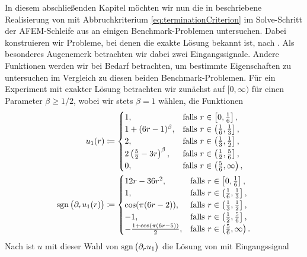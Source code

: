 In diesem abschließenden Kapitel möchten wir nun die in
 beschriebene Realisierung von
 mit Abbruchkriterium
\eqref{eq:terminationCriterion} im Solve-Schritt der AFEM-Schleife aus
 an einigen Benchmark-Problemen untersuchen.
Dabei konstruieren wir Probleme, bei denen die exakte Lösung bekannt ist,
nach . 
Als besonderes Augenemerk betrachten wir dabei zwei Eingangssignale.
Andere Funktionen werden wir bei Bedarf betrachten, um bestimmte Eigenschaften
zu untersuchen im Vergleich zu diesen beiden Benchmark-Problemen.
Für ein Experiment mit exakter Lösung betrachten wir zunächst auf $[0,\infty)$
für einen Parameter $\beta\geq 1/2$, wobei wir stets $\beta =1$ wählen, 
die Funktionen
\begin{align*}
  u_1(r)&\coloneqq
  \begin{cases}
    1, 
    & \text{falls } r\in \left[0,\frac{1}{6}\right],\\
    1+(6r-1)^\beta, 
    & \text{falls } r\in \left(\frac{1}{6}, \frac{1}{3}\right],\\
    2, 
    & \text{falls } r\in \left(\frac{1}{3}, \frac{1}{2}\right],\\
    2\left(\frac{5}{2}-3r\right)^\beta, 
    & \text{falls } r\in \left(\frac{1}{2}, \frac{5}{6}\right],\\
    0, 
    & \text{falls } r\in \left(\frac{5}{6}, \infty\right),\\
  \end{cases}\\
  \operatorname{sgn}\big(\partial_r u_1(r)\big) 
  &\coloneqq
  \begin{cases}
    12r-36r^2, 
    & \text{falls } r\in \left[0,\frac{1}{6}\right],\\
    1, 
    & \text{falls } r\in \left(\frac{1}{6}, \frac{1}{3}\right],\\
    \cos(\pi(6r-2)), 
    & \text{falls } r\in \left(\frac{1}{3}, \frac{1}{2}\right],\\
    -1, 
    & \text{falls } r\in \left(\frac{1}{2}, \frac{5}{6}\right],\\
    -\frac{1+\cos(\pi(6r-5))}{2}, 
    & \text{falls } r\in \left(\frac{5}{6}, \infty\right).
  \end{cases}
\end{align*}
Nach  ist $u$ mit dieser Wahl von
$\operatorname{sgn}\big(\partial_r u_1\big)$ die Lösung von  mit
Eingangssignal

